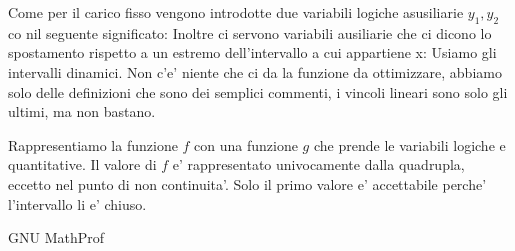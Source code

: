 Come per il carico fisso vengono introdotte due variabili logiche asusiliarie $ y_1, y_2 $ co nil seguente significato:
Inoltre ci servono variabili ausiliarie che ci dicono lo spostamento rispetto a un estremo dell'intervallo a cui appartiene x:
Usiamo gli intervalli dinamici.
Non c'e' niente che ci da la funzione da ottimizzare, abbiamo solo delle definizioni che sono dei semplici commenti, i vincoli lineari sono solo gli ultimi, ma non bastano. 

Rappresentiamo la funzione $ f $ con una funzione $ g $ che prende le variabili logiche e quantitative. 
Il valore di $ f $ e' rappresentato univocamente dalla quadrupla, eccetto nel punto di non continuita'. Solo il primo valore e' accettabile perche' l'intervallo li e' chiuso. 

GNU MathProf
